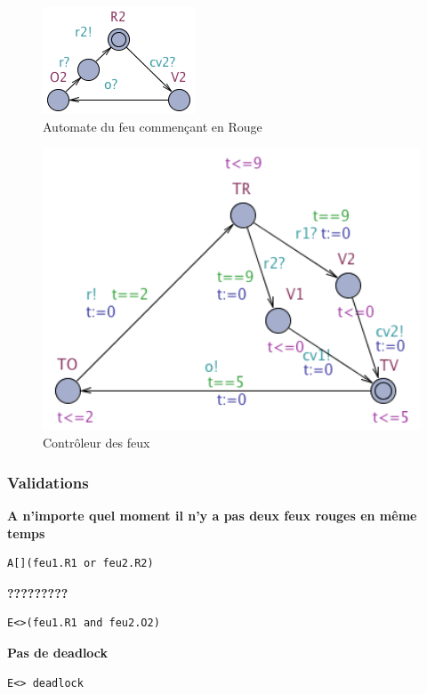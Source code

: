 \documentclass[11pt]{article}
\begin{document}
\begin{figure}[H]
	\centering
	\includegraphics{ressources/part2/Q8-2.png}
	\caption{Automate du feu commençant en Rouge}
\end{figure}

\begin{figure}[H]
	\centering
	\includegraphics[width=1\textwidth]{ressources/part2/Q8-3.png}
	\caption{Contrôleur des feux}
\end{figure}

\subsubsection{Validations}

\textbf{A n'importe quel moment il n'y a pas deux feux rouges en même temps}
\begin{verbatim}
A[](feu1.R1 or feu2.R2)
\end{verbatim}

\textbf{?????????}
\begin{verbatim}
E<>(feu1.R1 and feu2.O2)
\end{verbatim}

\textbf{Pas de deadlock}
\begin{verbatim}
E<> deadlock
\end{verbatim}
\end{document}
